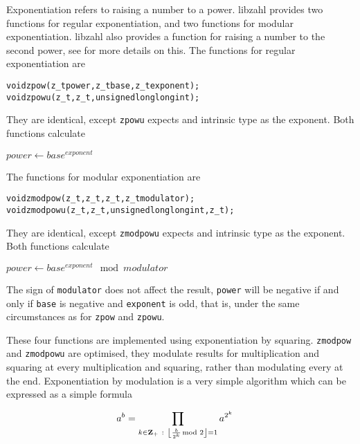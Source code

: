 Exponentiation refers to raising a number to
a power. libzahl provides two functions for
regular exponentiation, and two functions for
modular exponentiation. libzahl also provides
a function for raising a number to the second
power, see  for
more details on this. The functions for regular
exponentiation are

\begin{alltt}
   void zpow(z_t power, z_t base, z_t exponent);
   void zpowu(z_t, z_t, unsigned long long int);
\end{alltt}

\noindent
They are identical, except {\tt zpowu} expects
and intrinsic type as the exponent. Both functions
calculate

\vspace{1em}
$power \gets base^{exponent}$
\vspace{1em}

\noindent
The functions for modular exponentiation are
\begin{alltt}
   void zmodpow(z_t, z_t, z_t, z_t modulator);
   void zmodpowu(z_t, z_t, unsigned long long int, z_t);
\end{alltt}

\noindent
They are identical, except {\tt zmodpowu} expects
and intrinsic type as the exponent. Both functions
calculate

\vspace{1em}
$power \gets base^{exponent} \mod modulator$
\vspace{1em}

The sign of {\tt modulator} does not affect the
result, {\tt power} will be negative if and only
if {\tt base} is negative and {\tt exponent} is
odd, that is, under the same circumstances as for
{\tt zpow} and {\tt zpowu}.

These four functions are implemented using
exponentiation by squaring. {\tt zmodpow} and
{\tt zmodpowu} are optimised, they modulate
results for multiplication and squaring at
every multiplication and squaring, rather than
modulating every at the end. Exponentiation
by modulation is a very simple algorithm which
can be expressed as a simple formula

\vspace{-1em}
\[ \hspace*{-0.4cm}
    a^b =
    \prod_{k \in \textbf{Z}_{+} ~:~ \left \lfloor \frac{b}{2^k} \hspace*{-1ex} \mod 2 \right \rfloor = 1}
    a^{2^k}
\]

